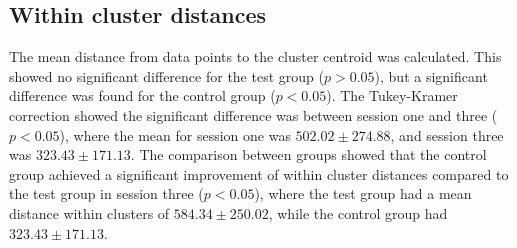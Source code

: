 \subsection{Within cluster distances}
The mean distance from data points to the cluster centroid was calculated. This showed no significant difference for the test group ($p > 0.05$), but a significant difference was found for the control group ($p < 0.05$). The Tukey-Kramer correction showed the significant difference was between session one and three ($p < 0.05$), where the mean for session one was $502.02 \pm 274.88$, and session three was $323.43 \pm 171.13$. The comparison between groups showed that the control group achieved a significant improvement of within cluster distances compared to the test group in session three ($p < 0.05$), where the test group had a mean distance within clusters of $584.34 \pm 250.02$, while the control group had $323.43 \pm 171.13$.
%


